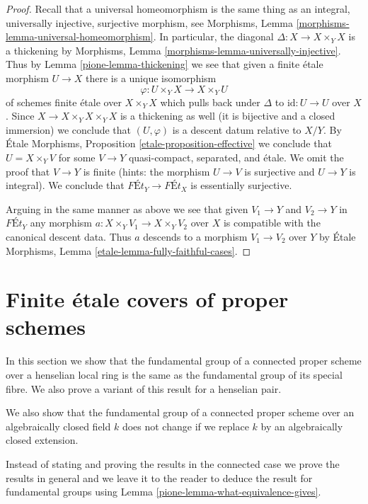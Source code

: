 \begin{proof}

Recall that a universal homeomorphism is the same thing as an
integral, universally injective, surjective morphism, see
Morphisms, Lemma \ref{morphisms-lemma-universal-homeomorphism}.
In particular, the diagonal $\Delta : X \to X \times_Y X$ is a thickening
by Morphisms, Lemma \ref{morphisms-lemma-universally-injective}.
Thus by Lemma \ref{pione-lemma-thickening}
we see that given a finite \'etale morphism $U \to X$
there is a unique isomorphism
$$
\varphi : U \times_Y X \to X \times_Y U
$$
of schemes finite \'etale over $X \times_Y X$ which pulls back under
$\Delta$ to $\text{id} : U \to U$ over $X$.
Since $X \to X \times_Y X \times_Y X$
is a thickening as well (it is bijective and a closed immersion)
we conclude that $(U, \varphi)$ is a descent datum relative to $X/Y$.
By \'Etale Morphisms, Proposition \ref{etale-proposition-effective}
we conclude that $U = X \times_Y V$ for some $V \to Y$
quasi-compact, separated, and \'etale.
We omit the proof that $V \to Y$ is finite (hints:
the morphism $U \to V$ is surjective and $U \to Y$ is integral).
We conclude that $\textit{F\'Et}_Y \to \textit{F\'Et}_X$
is essentially surjective.

\medskip\noindent
Arguing in the same manner as above we see that given
$V_1 \to Y$ and $V_2 \to Y$ in $\textit{F\'Et}_Y$ any
morphism $a : X \times_Y V_1 \to X \times_Y V_2$ over $X$
is compatible with the canonical descent data. Thus $a$
descends to a morphism $V_1 \to V_2$ over $Y$ by
\'Etale Morphisms, Lemma \ref{etale-lemma-fully-faithful-cases}.
\end{proof}

\section{Finite \'etale covers of proper schemes}
\label{pione-section-finite-etale-over-proper}
In this section we show that the fundamental group of a connected proper
scheme over a henselian local ring is the same as the fundamental
group of its special fibre. We also prove a variant of this result for
a henselian pair.

\medskip\noindent
We also show that the fundamental
group of a connected proper scheme over an algebraically closed field $k$
does not change if we replace $k$ by an algebraically closed extension.

\medskip\noindent
Instead of stating and proving the results in the connected case
we prove the results in general and we leave it to the reader to deduce
the result for fundamental groups using
Lemma \ref{pione-lemma-what-equivalence-gives}.

